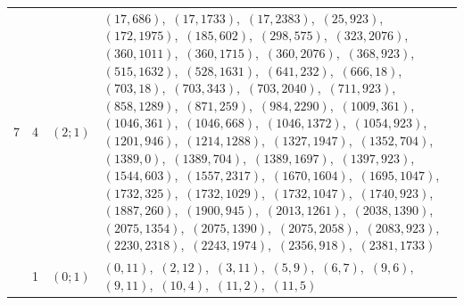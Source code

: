 \documentclass[11pt]{article}
\begin{document}
\begin{longtable}{@{}rrl>{\raggedright\arraybackslash}p{}@{}}
7 & 4 & $(2;1)$ & $(17,686)$,\allowbreak\ $(17,1733)$,\allowbreak\ $(17,2383)$,\allowbreak\ $(25,923)$,\allowbreak\ $(172,1975)$,\allowbreak\ $(185,602)$,\allowbreak\ $(298,575)$,\allowbreak\ $(323,2076)$,\allowbreak\ $(360,1011)$,\allowbreak\ $(360,1715)$,\allowbreak\ $(360,2076)$,\allowbreak\ $(368,923)$,\allowbreak\ $(515,1632)$,\allowbreak\ $(528,1631)$,\allowbreak\ $(641,232)$,\allowbreak\ $(666,18)$,\allowbreak\ $(703,18)$,\allowbreak\ $(703,343)$,\allowbreak\ $(703,2040)$,\allowbreak\ $(711,923)$,\allowbreak\ $(858,1289)$,\allowbreak\ $(871,259)$,\allowbreak\ $(984,2290)$,\allowbreak\ $(1009,361)$,\allowbreak\ $(1046,361)$,\allowbreak\ $(1046,668)$,\allowbreak\ $(1046,1372)$,\allowbreak\ $(1054,923)$,\allowbreak\ $(1201,946)$,\allowbreak\ $(1214,1288)$,\allowbreak\ $(1327,1947)$,\allowbreak\ $(1352,704)$,\allowbreak\ $(1389,0)$,\allowbreak\ $(1389,704)$,\allowbreak\ $(1389,1697)$,\allowbreak\ $(1397,923)$,\allowbreak\ $(1544,603)$,\allowbreak\ $(1557,2317)$,\allowbreak\ $(1670,1604)$,\allowbreak\ $(1695,1047)$,\allowbreak\ $(1732,325)$,\allowbreak\ $(1732,1029)$,\allowbreak\ $(1732,1047)$,\allowbreak\ $(1740,923)$,\allowbreak\ $(1887,260)$,\allowbreak\ $(1900,945)$,\allowbreak\ $(2013,1261)$,\allowbreak\ $(2038,1390)$,\allowbreak\ $(2075,1354)$,\allowbreak\ $(2075,1390)$,\allowbreak\ $(2075,2058)$,\allowbreak\ $(2083,923)$,\allowbreak\ $(2230,2318)$,\allowbreak\ $(2243,1974)$,\allowbreak\ $(2356,918)$,\allowbreak\ $(2381,1733)$\\
\addlinespace[3pt]
13 & 1 & $(0;1)$ & $(0,11)$,\allowbreak\ $(2,12)$,\allowbreak\ $(3,11)$,\allowbreak\ $(5,9)$,\allowbreak\ $(6,7)$,\allowbreak\ $(9,6)$,\allowbreak\ $(9,11)$,\allowbreak\ $(10,4)$,\allowbreak\ $(11,2)$,\allowbreak\ $(11,5)$\\

\end{longtable}
\end{document}
